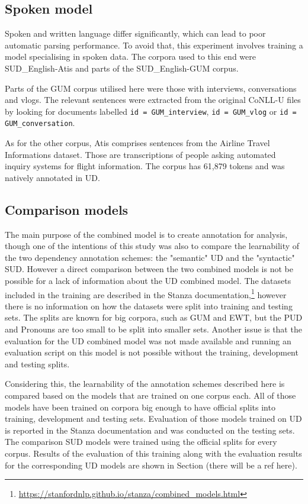 \subsection{Spoken model}
Spoken and written language differ significantly, which can lead to poor automatic parsing performance. To avoid that, this experiment involves training a model specialising in spoken data. The corpora used to this end were SUD\_English-Atis and parts of the SUD\_English-GUM corpus. 

Parts of the GUM corpus utilised here were those with interviews, conversations and vlogs. The relevant sentences were extracted from the original CoNLL-U files by looking for documents labelled \texttt{id = GUM\_interview}, \texttt{id = GUM\_vlog} or \texttt{id = GUM\_conversation}. 

As for the other corpus, Atis comprises sentences from the Airline Travel Informations dataset. Those are transcriptions of people asking automated inquiry systems for flight information. The corpus has 61,879 tokens and was natively annotated in UD. 

\subsection{Comparison models}
The main purpose of the combined model is to create annotation for analysis, though one of the intentions of this study was also to compare the learnability of the two dependency annotation schemes: the "semantic" UD and the "syntactic" SUD. However a direct comparison between the two combined models is not be possible for a lack of information about the UD combined model. The datasets included in the training are described in the Stanza documentation,\footnote{\url{https://stanfordnlp.github.io/stanza/combined_models.html}} however there is no information on how the datasets were split into training and testing sets. The splits are known for big corpora, such as GUM and EWT, but the PUD and Pronouns are too small to be split into smaller sets. Another issue is that the evaluation for the UD combined model was not made available and running an evaluation script on this model is not possible without the training, development and testing splits. 

Considering this, the learnability of the annotation schemes described here is compared based on the models that are trained on one corpus each. All of those models have been trained on corpora big enough to have official splits into training, development and testing sets. Evaluation of those models trained on UD is reported in the Stanza documentation and was conducted on the testing sets. The comparison SUD models were trained using the official splits for every corpus. Results of the evaluation of this training along with the evaluation results for the corresponding UD models are shown in Section (there will be a ref here).

